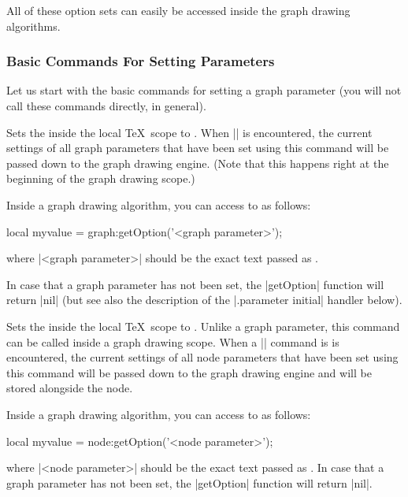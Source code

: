 All of these option sets can easily be accessed inside the graph 
drawing algorithms.



\subsubsection{Basic Commands For Setting Parameters}

Let us start with the basic commands for setting a graph parameter
(you will not call these commands directly, in general).

\begin{command}{\pgfgdgraphparameter{}} 
  Sets the  inside the local \TeX\ scope to
  . When |\pgfgdbeginscope| is encountered,
  the current settings of all graph parameters that have been set
  using this command will be passed down to the graph drawing
  engine. (Note that this happens right at the beginning of the graph
  drawing scope.)

  Inside a graph drawing algorithm, you can access to  as
  follows:
\begin{codeexample}
  local myvalue = graph:getOption('<graph parameter>');
\end{codeexample}
  where |<graph parameter>| should be the exact text passed as
  .

  In case that a graph parameter has not been set, the |getOption|
  function will return |nil| (but see also the description of the
  |.parameter initial| handler below).
\end{command}


\begin{command}{\pgfgdnodeparameter{}} 
  Sets the  inside the local \TeX\ scope to
  . Unlike a graph parameter, this command can 
  be called inside a graph drawing scope. When a |\pgfnode| command is
  is encountered, the current settings of all node parameters that
  have been set using this command will be passed down to the graph
  drawing engine and will be stored alongside the node.

  Inside a graph drawing algorithm, you can access to  as
  follows:
\begin{codeexample}
  local myvalue = node:getOption('<node parameter>');
\end{codeexample}
  where |<node parameter>| should be the exact text passed as
  . In case that a graph parameter has not been
  set, the |getOption| function will return |nil|.
\end{command}

